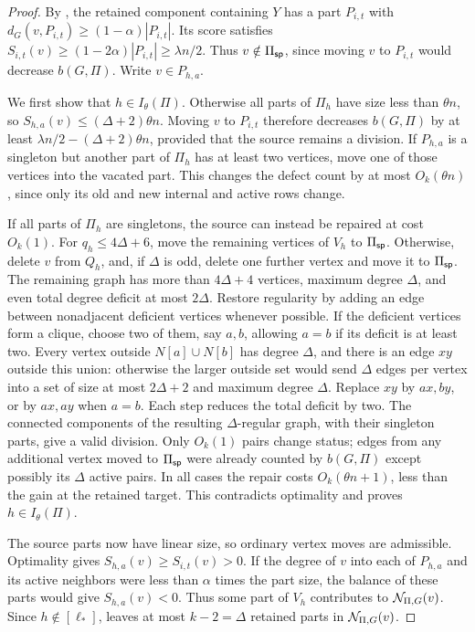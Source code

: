 \begin{proof}
By , the retained component containing $Y$ has a part $P_{i,t}$ with $d_G(v,P_{i,t})\geq(1-\alpha)|P_{i,t}|$. Its score satisfies $S_{i,t}(v)\geq(1-2\alpha)|P_{i,t}|\geq\lambda n/2$. Thus $v\notin\Pi_{\mathsf{sp}}$, since moving $v$ to $P_{i,t}$ would decrease $b(G,\Pi)$. Write $v\in P_{h,a}$.

We first show that $h\in I_\theta(\Pi)$. Otherwise all parts of $\Pi_h$ have size less than $\theta n$, so $S_{h,a}(v)\leq(\Delta+2)\theta n$. Moving $v$ to $P_{i,t}$ therefore decreases $b(G,\Pi)$ by at least $\lambda n/2-(\Delta+2)\theta n$, provided that the source remains a division. If $P_{h,a}$ is a singleton but another part of $\Pi_h$ has at least two vertices, move one of those vertices into the vacated part. This changes the defect count by at most $O_k(\theta n)$, since only its old and new internal and active rows change.

If all parts of $\Pi_h$ are singletons, the source can instead be repaired at cost $O_k(1)$. For $q_h\leq4\Delta+6$, move the remaining vertices of $V_h$ to $\Pi_{\mathsf{sp}}$. Otherwise, delete $v$ from $Q_h$, and, if $\Delta$ is odd, delete one further vertex and move it to $\Pi_{\mathsf{sp}}$. The remaining graph has more than $4\Delta+4$ vertices, maximum degree $\Delta$, and even total degree deficit at most $2\Delta$. Restore regularity by adding an edge between nonadjacent deficient vertices whenever possible. If the deficient vertices form a clique, choose two of them, say $a,b$, allowing $a=b$ if its deficit is at least two. Every vertex outside $N[a]\cup N[b]$ has degree $\Delta$, and there is an edge $xy$ outside this union: otherwise the larger outside set would send $\Delta$ edges per vertex into a set of size at most $2\Delta+2$ and maximum degree $\Delta$. Replace $xy$ by $ax,by$, or by $ax,ay$ when $a=b$. Each step reduces the total deficit by two. The connected components of the resulting $\Delta$-regular graph, with their singleton parts, give a valid division. Only $O_k(1)$ pairs change status; edges from any additional vertex moved to $\Pi_{\mathsf{sp}}$ were already counted by $b(G,\Pi)$ except possibly its $\Delta$ active pairs. In all cases the repair costs $O_k(\theta n+1)$, less than the gain at the retained target. This contradicts optimality and proves $h\in I_\theta(\Pi)$.

The source parts now have linear size, so ordinary vertex moves are admissible. Optimality gives $S_{h,a}(v)\geq S_{i,t}(v)>0$. If the degree of $v$ into each of $P_{h,a}$ and its active neighbors were less than $\alpha$ times the part size, the balance of these parts would give $S_{h,a}(v)<0$. Thus some part of $V_h$ contributes to ${\mathcal N}_{\Pi,G}(v)$. Since $h\notin[\ell_\ast]$,  leaves at most $k-2=\Delta$ retained parts in ${\mathcal N}_{\Pi,G}(v)$.
\end{proof}

